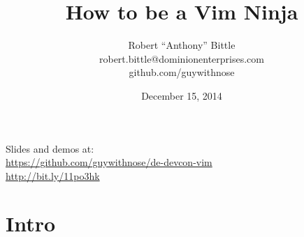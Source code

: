 \documentclass{beamer}
\title[How to be a Vim Ninja]{How to be a Vim Ninja}
\author{\hspace{12pt}Robert “Anthony” Bittle\hspace{12pt}\\\hspace{12pt}robert.bittle@dominionenterprises.com\hspace{12pt}\\\hspace{12pt}github.com/guywithnose\hspace{12pt}}
\date{December 15, 2014}
\begin{document}
    \begin{frame}
        \titlepage
        Slides and demos at:\\
        \href{https://github.com/guywithnose/de-devcon-vim}{https://github.com/guywithnose/de-devcon-vim}\\
        \href{http://bit.ly/11po3hk}{http://bit.ly/11po3hk}
    \end{frame}

    \section{Intro}

\end{document}
